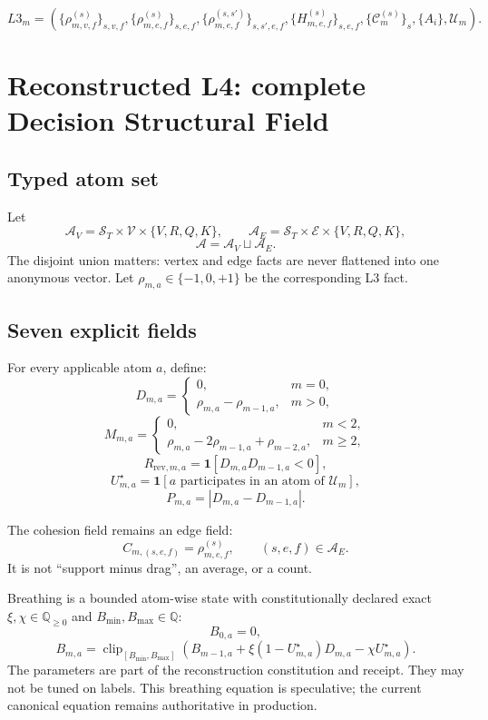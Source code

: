 \documentclass[11pt,oneside]{article}
\newcommand{\Q}{\mathbb{Q}}
\newcommand{\clip}{\operatorname{clip}}
\newcommand{\Vertices}{\mathcal{V}}
\newcommand{\Edges}{\mathcal{E}}
\newcommand{\Scales}{\mathcal{S}}
\newcommand{\Atoms}{\mathcal{A}}
\begin{document}
\[
  L3_m=
  \left(
    \{\rho^{(s)}_{m,v,f}\}_{s,v,f},
    \{\rho^{(s)}_{m,e,f}\}_{s,e,f},
    \{\rho^{(s,s')}_{m,e,f}\}_{s,s',e,f},
    \{H^{(s)}_{m,e,f}\}_{s,e,f},
    \{\mathcal{C}^{(s)}_m\}_s,
    \{A_i\},
    \mathcal{U}_m
  \right).
\]

\section{Reconstructed L4: complete Decision Structural Field}

\subsection{Typed atom set}

Let
\[
  \Atoms_V=\Scales_T\times\Vertices\times\{V,R,Q,K\},
  \qquad
  \Atoms_E=\Scales_T\times\Edges\times\{V,R,Q,K\},
\]
\[
  \Atoms=\Atoms_V\sqcup\Atoms_E.
\]
The disjoint union matters: vertex and edge facts are never flattened into
one anonymous vector. Let \(\rho_{m,a}\in\{-1,0,+1\}\) be the corresponding
L3 fact.

\subsection{Seven explicit fields}

For every applicable atom \(a\), define:
\[
  D_{m,a}=
  \begin{cases}
  0,&m=0,\\
  \rho_{m,a}-\rho_{m-1,a},&m>0,
  \end{cases}
\]
\[
  M_{m,a}=
  \begin{cases}
  0,&m<2,\\
  \rho_{m,a}-2\rho_{m-1,a}+\rho_{m-2,a},&m\geq2,
  \end{cases}
\]
\[
  R_{\mathrm{rev},m,a}
  =
  \mathbf{1}[D_{m,a}D_{m-1,a}<0],
\]
\[
  U^\star_{m,a}
  =
  \mathbf{1}[a\text{ participates in an atom of }\mathcal{U}_m],
\]
\[
  P_{m,a}=|D_{m,a}-D_{m-1,a}|.
\]

The cohesion field remains an edge field:
\[
  C_{m,(s,e,f)}=\rho^{(s)}_{m,e,f},
  \qquad (s,e,f)\in\Atoms_E.
\]
It is not ``support minus drag'', an average, or a count.

Breathing is a bounded atom-wise state with constitutionally declared exact
\(\xi,\chi\in\Q_{\geq0}\) and \(B_{\min},B_{\max}\in\Q\):
\[
  B_{0,a}=0,
\]
\[
  B_{m,a}
  =
  \clip_{[B_{\min},B_{\max}]}
  \left(
    B_{m-1,a}
    +\xi(1-U^\star_{m,a})D_{m,a}
    -\chi U^\star_{m,a}
  \right).
\]
The parameters are part of the reconstruction constitution and receipt. They
may not be tuned on labels. This breathing equation is speculative; the
current canonical equation remains authoritative in production.
\end{document}
